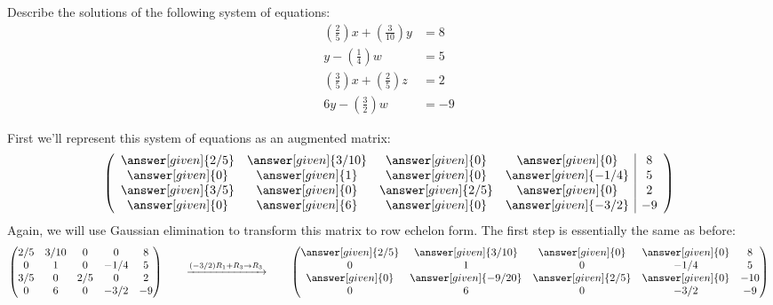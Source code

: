\documentclass{ximera}
\begin{document}
\begin{example}[No solutions]
  Describe the solutions of the following system of equations:
  \begin{align*}
\left(\frac{2}{5}\right)x + \left(\frac{3}{10}\right) y &= 8\\
y -\left(\frac{1}{4}\right)w &= 5\\
\left(\frac{3}{5}\right)x + \left(\frac{2}{5}\right)z &= 2\\
6y - \left(\frac{3}{2}\right)w &= -9
\end{align*}
\begin{explanation}
First we'll represent this system of equations as an augmented matrix:
\[
  \left(
    \begin{array}{cccc|c}
      \answer[given]{2/5}&  \answer[given]{3/10} & \answer[given]{0} &\answer[given]{0} &8 \\
      \answer[given]{0}&  \answer[given]{1} & \answer[given]{0} &\answer[given]{-1/4} & 5\\
      \answer[given]{3/5}&  \answer[given]{0} & \answer[given]{2/5} &\answer[given]{0} &2\\
      \answer[given]{0}&  \answer[given]{6} & \answer[given]{0} &\answer[given]{-3/2} &-9
    \end{array}
  \right)
\]
Again, we will use Gaussian elimination to transform this matrix to
row echelon form. The first step is essentially the same as before:
\[
  \begin{pmatrix}
    {2/5}&  {3/10} & {0} &{0} &8 \\
    {0}&  {1} & {0} &{-1/4} & 5\\
    {3/5}&  {0} & {2/5} &{0} &2\\
    {0}&  {6} & {0} &{-3/2} &-9
  \end{pmatrix}
  \qquad\xrightarrow{(-3/2) R_1 + R_3\to R_3}\qquad
  \begin{pmatrix}
    \answer[given]{2/5}&  \answer[given]{3/10} & \answer[given]{0} &\answer[given]{0} &8 \\
    {0}&  {1} & {0} &{-1/4} & 5\\
    \answer[given]{0}&  \answer[given]{-9/20} & \answer[given]{2/5} &\answer[given]{0} &-10\\
    {0}&  {6} & {0} &{-3/2} &-9
  \end{pmatrix}
\]
\end{explanation}
\end{example}
\end{document}
